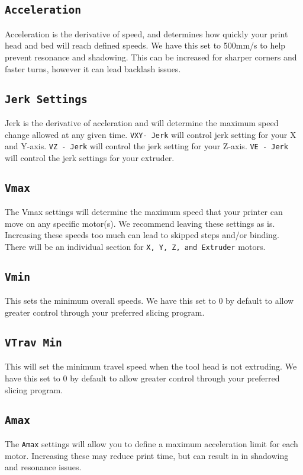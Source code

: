 \subsection{\texttt{Acceleration}}
Acceleration is the derivative of speed, and determines how quickly your print head and bed will reach defined speeds. We have this set to 500mm/s\textsuperscript{} to help prevent resonance and shadowing. This can be increased for sharper corners and faster turns, however it can lead backlash issues.

\subsection{\texttt{Jerk Settings}}
Jerk is the derivative of accleration and will determine the maximum speed change allowed at any given time. \texttt{VXY- Jerk} will control jerk setting for your X and Y-axis. \texttt{VZ - Jerk} will control the jerk setting for your Z-axis. \texttt{VE - Jerk} will control the jerk settings for your extruder.

\subsection{\texttt{Vmax}}
The Vmax settings will determine the maximum speed that your printer can move on any specific motor(s). We recommend leaving these settings as is. Increasing these speeds too much can lead to skipped steps and/or binding. There will be an individual section for \texttt{X, Y, Z, and Extruder} motors. 

\subsection{\texttt{Vmin}}
This sets the minimum overall speeds. We have this set to 0 by default to allow greater control through your preferred slicing program. 

\subsection{\texttt{VTrav Min}}
This will set the minimum travel speed when the tool head is not extruding. We have this set to 0 by default to allow greater control through your preferred slicing program. 

\subsection{\texttt{Amax}}
The \texttt{Amax} settings will allow you to define a maximum acceleration limit for each motor. Increasing these may reduce print time, but can result in in shadowing and resonance issues.

